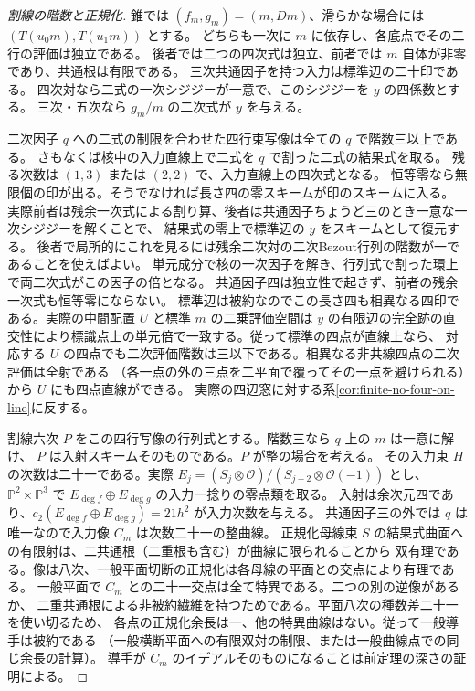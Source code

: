 \begin{proof}[割線の階数と正規化]
錐では $(f_m,g_m)=(m,Dm)$、滑らかな場合には $(T(u_0m),T(u_1m))$ とする。
どちらも一次に $m$ に依存し、各底点でその二行の評価は独立である。
後者では二つの四次式は独立、前者では $m$ 自体が非零であり、共通根は有限である。
三次共通因子を持つ入力は標準辺の二十印である。
四次対なら二式の一次シジジーが一意で、このシジジーを $y$ の四係数とする。
三次・五次なら $g_m/m$ の二次式が $y$ を与える。

二次因子 $q$ への二式の制限を合わせた四行束写像は全ての $q$ で階数三以上である。
さもなくば核中の入力直線上で二式を $q$ で割った二式の結果式を取る。
残る次数は $(1,3)$ または $(2,2)$ で、入力直線上の四次式となる。
恒等零なら無限個の印が出る。そうでなければ長さ四の零スキームが印のスキームに入る。
実際前者は残余一次式による割り算、後者は共通因子ちょうど三のとき一意な一次シジジーを解くことで、
結果式の零上で標準辺の $y$ をスキームとして復元する。
後者で局所的にこれを見るには残余二次対の二次Bezout行列の階数が一であることを使えばよい。
単元成分で核の一次因子を解き、行列式で割った環上で両二次式がこの因子の倍となる。
共通因子四は独立性で起きず、前者の残余一次式も恒等零にならない。
標準辺は被約なのでこの長さ四も相異なる四印である。実際の中間配置 $U$ と標準 $m$ の二乗評価空間は
$y$ の有限辺の完全跡の直交性により標識点上の単元倍で一致する。従って標準の四点が直線上なら、
対応する $U$ の四点でも二次評価階数は三以下である。相異なる非共線四点の二次評価は全射である
（各一点の外の三点を二平面で覆ってその一点を避けられる）から $U$ にも四点直線ができる。
実際の四辺窓に対する系\ref{cor:finite-no-four-on-line}に反する。

割線六次 $P$ をこの四行写像の行列式とする。階数三なら $q$ 上の $m$ は一意に解け、
$P$ は入射スキームそのものである。$P$ が整の場合を考える。
その入力束 $H$ の次数は二十一である。実際
$E_j=(S_j\otimes\mathcal O)/(S_{j-2}\otimes\mathcal O(-1))$ とし、
$\mathbb P^2\times\mathbb P^3$ で $E_{\deg f}\oplus E_{\deg g}$ の入力一捻りの零点類を取る。
入射は余次元四であり、$c_2(E_{\deg f}\oplus E_{\deg g})=21h^2$ が入力次数を与える。
共通因子三の外では $q$ は唯一なので入力像 $C_m$ は次数二十一の整曲線。
正規化母線束 $S$ の結果式曲面への有限射は、二共通根（二重根も含む）が曲線に限られることから
双有理である。像は八次、一般平面切断の正規化は各母線の平面との交点により有理である。
一般平面で $C_m$ との二十一交点は全て特異である。二つの別の逆像があるか、
二重共通根による非被約繊維を持つためである。平面八次の種数差二十一を使い切るため、
各点の正規化余長は一、他の特異曲線はない。従って一般導手は被約である
（一般横断平面への有限双対の制限、または一般曲線点での同じ余長の計算）。
導手が $C_m$ のイデアルそのものになることは前定理の深さの証明による。


\end{proof}
